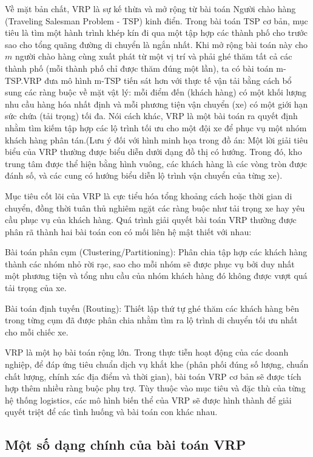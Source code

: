 \documentclass[12pt,a4paper]{article}
\numberwithin{figure}{subsection}
\begin{document}
Về mặt bản chất, VRP là sự kế thừa và mở rộng từ bài toán Người chào hàng (Traveling Salesman Problem - TSP) kinh điển. Trong bài toán TSP cơ bản, mục tiêu là tìm một hành trình khép kín đi qua một tập hợp các thành phố cho trước sao cho tổng quãng đường di chuyển là ngắn nhất. Khi mở rộng bài toán này cho $m$ người chào hàng cùng xuất phát từ một vị trí và phải ghé thăm tất cả các thành phố (mỗi thành phố chỉ được thăm đúng một lần), ta có bài toán m-TSP.VRP đưa mô hình m-TSP tiến sát hơn với thực tế vận tải bằng cách bổ sung các ràng buộc về mặt vật lý: mỗi điểm đến (khách hàng) có một khối lượng nhu cầu hàng hóa nhất định và mỗi phương tiện vận chuyển (xe) có một giới hạn sức chứa (tải trọng) tối đa. Nói cách khác, VRP là một bài toán ra quyết định nhằm tìm kiếm tập hợp các lộ trình tối ưu cho một đội xe để phục vụ một nhóm khách hàng phân tán.(Lưu ý đối với hình minh họa trong đồ án: Một lời giải tiêu biểu của VRP thường được biểu diễn dưới dạng đồ thị có hướng. Trong đó, kho trung tâm được thể hiện bằng hình vuông, các khách hàng là các vòng tròn được đánh số, và các cung có hướng biểu diễn lộ trình vận chuyển của từng xe).

Mục tiêu cốt lõi của VRP là cực tiểu hóa tổng khoảng cách hoặc thời gian di chuyển, đồng thời tuân thủ nghiêm ngặt các ràng buộc như tải trọng xe hay yêu cầu phục vụ của khách hàng. Quá trình giải quyết bài toán VRP thường được phân rã thành hai bài toán con có mối liên hệ mật thiết với nhau:

Bài toán phân cụm (Clustering/Partitioning): Phân chia tập hợp các khách hàng thành các nhóm nhỏ rời rạc, sao cho mỗi nhóm sẽ được phục vụ bởi duy nhất một phương tiện và tổng nhu cầu của nhóm khách hàng đó không được vượt quá tải trọng của xe.

Bài toán định tuyến (Routing): Thiết lập thứ tự ghé thăm các khách hàng bên trong từng cụm đã được phân chia nhằm tìm ra lộ trình di chuyển tối ưu nhất cho mỗi chiếc xe.

VRP là một họ bài toán rộng lớn. Trong thực tiễn hoạt động của các doanh nghiệp, để đáp ứng tiêu chuẩn dịch vụ khắt khe (phân phối đúng số lượng, chuẩn chất lượng, chính xác địa điểm và thời gian), bài toán VRP cơ bản sẽ được tích hợp thêm nhiều ràng buộc phụ trợ. Tùy thuộc vào mục tiêu và đặc thù của từng hệ thống logistics, các mô hình biến thể của VRP sẽ được hình thành để giải quyết triệt để các tình huống và bài toán con khác nhau.

\subsection{Một số dạng chính của bài toán VRP}
\end{document}
